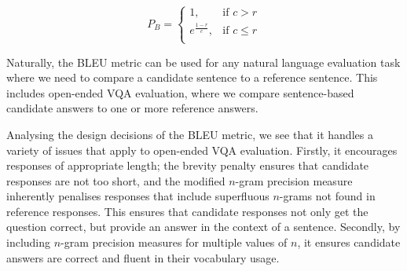 \begin{equation}
    P_B = \begin{cases}
    1, &\text{if } c > r\\
    e^{\frac{1-r}{c}}, &\text{if } c \leq r\\
    \end{cases}
    \label{equation:bleu_brevity_penalty}
\end{equation}

Naturally, the BLEU metric can be used for any natural language evaluation task where we need to compare a candidate sentence to a reference sentence. This includes open-ended VQA evaluation, where we compare sentence-based candidate answers to one or more reference answers.

Analysing the design decisions of the BLEU metric, we see that it handles a variety of issues that apply to open-ended VQA evaluation. Firstly, it encourages responses of appropriate length; the brevity penalty ensures that candidate responses are not too short, and the modified \(n\)-gram precision measure inherently penalises responses that include superfluous \(n\)-grams not found in reference responses. This ensures that candidate responses not only get the question correct, but provide an answer in the context of a sentence. Secondly, by including \(n\)-gram precision measures for multiple values of \(n\), it ensures candidate answers are correct and fluent in their vocabulary usage.

